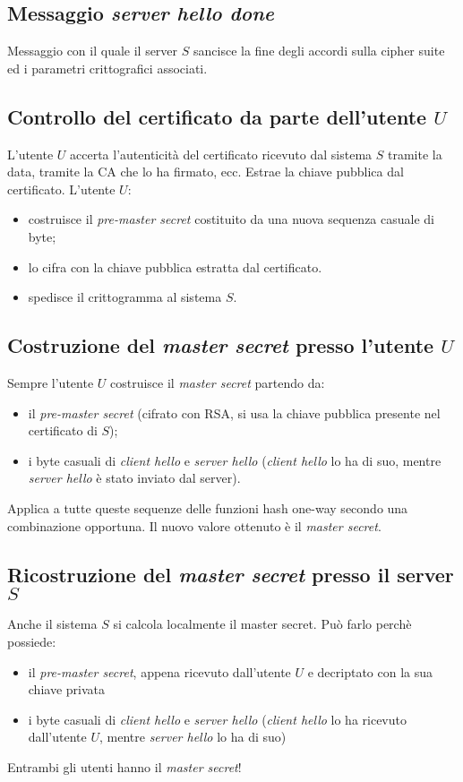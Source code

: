 \subsection{Messaggio \emph{server hello done}}
Messaggio con il quale il server $S$ sancisce la fine degli accordi sulla cipher suite ed i parametri crittografici associati.

\subsection{Controllo del certificato da parte dell'utente $U$}
L'utente $U$ accerta l'autenticità del certificato ricevuto dal sistema $S$ tramite la data, tramite la CA che lo ha firmato, ecc. Estrae la chiave pubblica dal certificato. L'utente $U$:
\begin{itemize}
	\item costruisce il \emph{pre-master secret} costituito da una nuova sequenza casuale di byte;
	\item lo cifra con la chiave pubblica estratta dal certificato.
	\item spedisce il crittogramma al sistema $S$.
\end{itemize}


\subsection{Costruzione del \emph{master secret} presso l'utente $U$}
Sempre l'utente $U$ costruisce il \emph{master secret} partendo da:
\begin{itemize}
	\item il \emph{pre-master secret} (cifrato con RSA, si usa la chiave pubblica presente nel certificato di $S$);
	\item i byte casuali di \emph{client hello} e \emph{server hello} (\emph{client hello} lo ha di suo, mentre \emph{server hello} è stato inviato dal server).
\end{itemize} 
Applica a tutte queste sequenze delle funzioni hash one-way secondo una combinazione opportuna. Il nuovo valore ottenuto è il \emph{master secret}.

\subsection{Ricostruzione del \emph{master secret} presso il server $S$}
Anche il sistema $S$ si calcola localmente il master secret. Può farlo perchè possiede:
\begin{itemize}
	\item il \emph{pre-master secret}, appena ricevuto dall'utente $U$ e decriptato con la sua chiave privata
	\item i byte casuali di \emph{client hello} e \emph{server hello} (\emph{client hello} lo ha ricevuto dall'utente $U$, mentre \emph{server hello} lo ha di suo)
\end{itemize}
Entrambi gli utenti hanno il \emph{master secret}!

